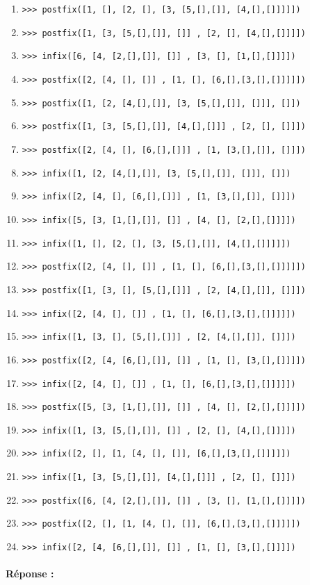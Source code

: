 \documentclass[11pt,a4paper]{article}
\begin{document}
\begin{enumerate}
\item \texttt{>{>}> postfix([1, [], [2, [], [3, [5,[],[]], [4,[],[]]]]])}
\item \texttt{>{>}> postfix([1, [3, [5,[],[]], []] , [2, [], [4,[],[]]]])}
\item \texttt{>{>}> infix([6, [4, [2,[],[]], []] , [3, [], [1,[],[]]]])}
\item \texttt{>{>}> postfix([2, [4, [], []] , [1, [], [6,[],[3,[],[]]]]])}
\item \texttt{>{>}> postfix([1, [2, [4,[],[]], [3, [5,[],[]], []]], []])}
\item \texttt{>{>}> postfix([1, [3, [5,[],[]], [4,[],[]]] , [2, [], []]])}
\item \texttt{>{>}> postfix([2, [4, [], [6,[],[]]] , [1, [3,[],[]], []]])}
\item \texttt{>{>}> infix([1, [2, [4,[],[]], [3, [5,[],[]], []]], []])}
\item \texttt{>{>}> infix([2, [4, [], [6,[],[]]] , [1, [3,[],[]], []]])}
\item \texttt{>{>}> infix([5, [3, [1,[],[]], []] , [4, [], [2,[],[]]]])}
\item \texttt{>{>}> infix([1, [], [2, [], [3, [5,[],[]], [4,[],[]]]]])}
\item \texttt{>{>}> postfix([2, [4, [], []] , [1, [], [6,[],[3,[],[]]]]])}
\item \texttt{>{>}> postfix([1, [3, [], [5,[],[]]] , [2, [4,[],[]], []]])}
\item \texttt{>{>}> infix([2, [4, [], []] , [1, [], [6,[],[3,[],[]]]]])}
\item \texttt{>{>}> infix([1, [3, [], [5,[],[]]] , [2, [4,[],[]], []]])}
\item \texttt{>{>}> postfix([2, [4, [6,[],[]], []] , [1, [], [3,[],[]]]])}
\item \texttt{>{>}> infix([2, [4, [], []] , [1, [], [6,[],[3,[],[]]]]])}
\item \texttt{>{>}> postfix([5, [3, [1,[],[]], []] , [4, [], [2,[],[]]]])}
\item \texttt{>{>}> infix([1, [3, [5,[],[]], []] , [2, [], [4,[],[]]]])}
\item \texttt{>{>}> infix([2, [], [1, [4, [], []], [6,[],[3,[],[]]]]])}
\item \texttt{>{>}> infix([1, [3, [5,[],[]], [4,[],[]]] , [2, [], []]])}
\item \texttt{>{>}> postfix([6, [4, [2,[],[]], []] , [3, [], [1,[],[]]]])}
\item \texttt{>{>}> postfix([2, [], [1, [4, [], []], [6,[],[3,[],[]]]]])}
\item \texttt{>{>}> infix([2, [4, [6,[],[]], []] , [1, [], [3,[],[]]]])}
\end{enumerate}

\newpage
\paragraph{Réponse :}\mbox{}\\
\framebox[\textwidth]{$\rule{0cm}{22cm}$}

\end{document}
